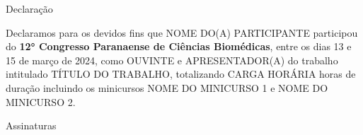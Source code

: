 \documentclass[12pt]{article}
\begin{document}
	\thispagestyle{empty} %
	\sffamily %
	\justifying %
	\hfill \vfill %
	
	
	\centerline{\Huge Declaração}
	\large
	
	\vfill
	
	Declaramos para os devidos fins que
	NOME DO(A) PARTICIPANTE
	participou do 
	\textbf{12° Congresso Paranaense de Ciências Biomédicas},
	entre os dias 
	13 e 15 de março de 2024,
	como OUVINTE
	e APRESENTADOR(A) do trabalho intitulado
	TÍTULO DO TRABALHO,
	totalizando 
	CARGA HORÁRIA 
	horas de duração
	incluindo os minicursos
	NOME DO MINICURSO 1
	e 
	NOME DO MINICURSO 2.
	
	
	\vfill
	
	\normalsize
	Assinaturas
	
	\vfill \hfill %
\end{document}
